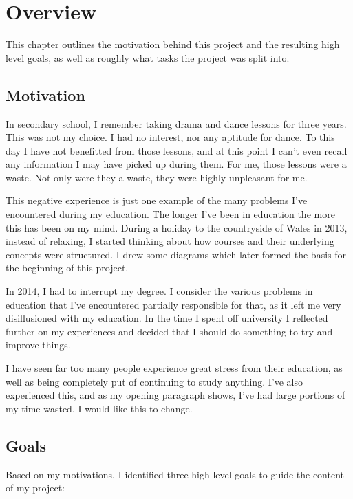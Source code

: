 \chapter{Overview}
\label{chapter:overview}
  This chapter outlines the motivation behind this project and the resulting high level goals, as well as roughly what tasks the project was split into.

  \section{Motivation}
    In secondary school, I remember taking drama and dance lessons for three years. This was not my choice. I had no interest, nor any aptitude for dance. To this day I have not benefitted from those lessons, and at this point I can't even recall any information I may have picked up during them. For me, those lessons were a waste. Not only were they a waste, they were highly unpleasant for me.

    This negative experience is just one example of the many problems I've encountered during my education. The longer I've been in education the more this has been on my mind. During a holiday to the countryside of Wales in 2013, instead of relaxing, I started thinking about how courses and their underlying concepts were structured. I drew some diagrams which later formed the basis for the beginning of this project.

    In 2014, I had to interrupt my degree. I consider the various problems in education that I've encountered partially responsible for that, as it left me very disillusioned with my education. In the time I spent off university I reflected further on my experiences and decided that I should do something to try and improve things.

    I have seen far too many people experience great stress from their education, as well as being completely put of continuing to study anything. I've also experienced this, and as my opening paragraph shows, I've had large portions of my time wasted. I would like this to change.

  \section{Goals}
    Based on my motivations, I identified three high level goals to guide the content of my project:

